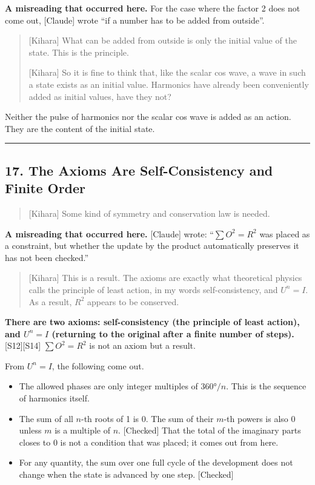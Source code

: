 \documentclass[
  a4paper,
]{article}
\providecommand{\tightlist}{%
  \setlength{\itemsep}{0pt}\setlength{\parskip}{0pt}}
\begin{document}
\textbf{A misreading that occurred here.} For the case where the factor
2 does not come out, {[}Claude{]} wrote ``if a number has to be added
from outside''.

\begin{quote}
{[}Kihara{]} What can be added from outside is only the initial value of
the state. This is the principle.

{[}Kihara{]} So it is fine to think that, like the scalar cos wave, a
wave in such a state exists as an initial value. Harmonics have already
been conveniently added as initial values, have they not?
\end{quote}

Neither the pulse of harmonics nor the scalar cos wave is added as an
action. They are the content of the initial state.

\begin{center}\rule{0.5\linewidth}{0.5pt}\end{center}

\subsection{17. The Axioms Are Self-Consistency and Finite
Order}\label{the-axioms-are-self-consistency-and-finite-order}

\begin{quote}
{[}Kihara{]} Some kind of symmetry and conservation law is needed.
\end{quote}

\textbf{A misreading that occurred here.} {[}Claude{]} wrote:
``\(\sum O^2 = R^2\) was placed as a constraint, but whether the update
by the product automatically preserves it has not been checked.''

\begin{quote}
{[}Kihara{]} This is a result. The axioms are exactly what theoretical
physics calls the principle of least action, in my words
self-consistency, and \(U^n = I\). As a result, \(R^2\) appears to be
conserved.
\end{quote}

\textbf{There are two axioms: self-consistency (the principle of least
action), and \(U^n = I\) (returning to the original after a finite
number of steps).} {[}S12{]}{[}S14{]} \(\sum O^2 = R^2\) is not an axiom
but a result.

From \(U^n = I\), the following come out.

\begin{itemize}
\tightlist
\item
  The allowed phases are only integer multiples of \(360°/n\). This is
  the sequence of harmonics itself.
\item
  The sum of all \(n\)-th roots of 1 is 0. The sum of their \(m\)-th
  powers is also 0 unless \(m\) is a multiple of \(n\). {[}Checked{]}
  That the total of the imaginary parts closes to 0 is not a condition
  that was placed; it comes out from here.
\item
  For any quantity, the sum over one full cycle of the development does
  not change when the state is advanced by one step. {[}Checked{]}
\end{itemize}
\end{document}
